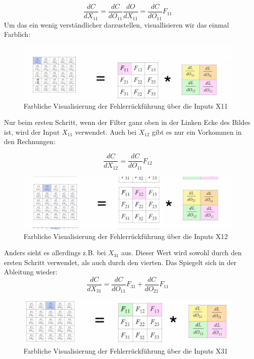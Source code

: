 \documentclass[12pt]{article}
\begin{document}
$$\frac {dC} {dX_{11}} = 
\frac {dC}{dO_{11}} \frac {dO}{dX_{11}} =
\frac {dC}{dO_{11}} F_{11}$$
Um das ein wenig verständlicher darzustellen, visuallisieren wir das einmal Farblich:

\begin{figure}[H]
\centering
\includegraphics[scale=0.80]{Images/TemporaryPlaceholders/Farbliche Visualisierung der Fehlerrückführung über die Inputs X11.png}
\caption{Farbliche Visualisierung der Fehlerrückführung über die Inputs X11}
\label{Farbliche Visualisierung der Fehlerrückführung über die Inputs X11}
\end{figure}

Nur beim ersten Schritt, wenn der Filter ganz oben in der Linken Ecke des Bildes ist, wird der Input $X_{11}$ verwendet. Auch bei $X_{12}$ gibt es nur ein Vorkommen in den Rechnungen:

$$\frac {dC} {dX_{12}} = \frac {dC}{dO_{11}} F_{12}$$

\begin{figure}[H]
\centering
\includegraphics[scale=0.80]{Images/TemporaryPlaceholders/Farbliche Visualisierung der Fehlerrückführung über die Inputs X12.png}
\caption{Farbliche Visualisierung der Fehlerrückführung über die Inputs X12}
\label{Farbliche Visualisierung der Fehlerrückführung über die Inputs X12}
\end{figure}

Anders sieht es allerdings z.B. bei $X_{31}$ aus. Dieser Wert wird sowohl durch den ersten Schritt verwendet, als auch durch den vierten. Das Spiegelt sich in der Ableitung wieder:
$$\frac {dC} {dX_{31}} = \frac {dC}{dO_{11}} F_{31} + \frac {dC}{dO_{21}} F_{11}$$

\begin{figure}[H]
\centering
\includegraphics[scale=0.80]{Images/TemporaryPlaceholders/Farbliche Visualisierung der Fehlerrückführung über die Inputs X31.png}
\caption{Farbliche Visualisierung der Fehlerrückführung über die Inputs X31}
\label{Farbliche Visualisierung der Fehlerrückführung über die Inputs X31}
\end{figure}
\end{document}
